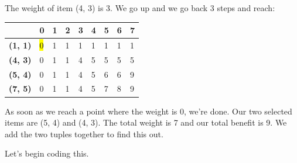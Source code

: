 \documentclass{article}
\begin{document}
The weight of item (4, 3) is 3. We go up and we go back 3 steps and reach:
\begin{center}
\begin{tabular}{|l|l|l|l|l|l|l|l|l|}
\hline
                & \textbf{0} & \textbf{1} & \textbf{2} & \textbf{3} & \textbf{4} & \textbf{5} & \textbf{6} & \textbf{7} \\ \hline
\textbf{(1, 1)} & \hl{0}          &1            &1            &1            &1            &1            &1            &1            \\ \hline
\textbf{(4, 3)} & 0          &1            &1            &4            &5            &5            &  5          &  5          \\ \hline
\textbf{(5, 4)} & 0          &1            &1            &4            &5            &6            &6            & 9           \\ \hline
\textbf{(7, 5)} & 0          & 1           & 1           &   4         &   5         &7            & 8           &9            \\ \hline
\end{tabular}
\end{center}
As soon as we reach a point where the weight is 0, we're done. Our two selected items are (5, 4) and (4, 3). The total weight is 7 and our total benefit is 9. We add the two tuples together to find this out. 

Let's begin coding this. 
\newpage
\end{document}
